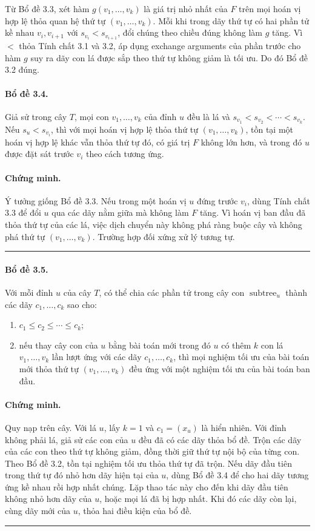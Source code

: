 \documentclass[11pt]{article}
\begin{document}
Từ Bổ đề 3.3, xét hàm $g(v_1,\ldots,v_k)$ là giá trị nhỏ nhất của $F$ trên mọi
hoán vị hợp lệ thỏa quan hệ thứ tự $(v_1,\ldots,v_k)$. Mỗi khi trong dãy thứ tự
có hai phần tử kề nhau $v_i,v_{i+1}$ với $s_{v_i}<s_{v_{i+1}}$, đổi chúng theo
chiều đúng không làm $g$ tăng. Vì $<$ thỏa Tính chất 3.1 và 3.2, áp dụng
exchange arguments của phần trước cho hàm $g$ suy ra dãy con lá được sắp theo
thứ tự không giảm là tối ưu. Do đó Bổ đề 3.2 đúng.

\paragraph{Bổ đề 3.4.}
Giả sử trong cây $T$, mọi con $v_1,\ldots,v_k$ của đỉnh $u$ đều là lá và
$s_{v_1}<s_{v_2}<\cdots<s_{v_k}$. Nếu $s_u<s_{v_i}$, thì với mọi hoán vị hợp lệ
thỏa thứ tự $(v_1,\ldots,v_k)$, tồn tại một hoán vị hợp lệ khác vẫn thỏa thứ tự
đó, có giá trị $F$ không lớn hơn, và trong đó $u$ được đặt sát trước $v_i$ theo
cách tương ứng.

\paragraph{Chứng minh.}
Ý tưởng giống Bổ đề 3.3. Nếu trong một hoán vị $u$ đứng trước $v_i$, dùng Tính
chất 3.3 để đổi $u$ qua các dãy nằm giữa mà không làm $F$ tăng. Vì hoán vị ban
đầu đã thỏa thứ tự của các lá, việc dịch chuyển này không phá ràng buộc cây và
không phá thứ tự $(v_1,\ldots,v_k)$. Trường hợp đối xứng xử lý tương tự.
\hfill\rule{0.55em}{0.55em}

\paragraph{Bổ đề 3.5.}
Với mỗi đỉnh $u$ của cây $T$, có thể chia các phần tử trong cây con
$\operatorname{subtree}_u$ thành các dãy $c_1,\ldots,c_k$ sao cho:
\begin{enumerate}
  \item $c_1\le c_2\le\cdots\le c_k$;
  \item nếu thay cây con của $u$ bằng bài toán mới trong đó $u$ có thêm $k$ con
  lá $v_1,\ldots,v_k$ lần lượt ứng với các dãy $c_1,\ldots,c_k$, thì mọi nghiệm
  tối ưu của bài toán mới thỏa thứ tự $(v_1,\ldots,v_k)$ đều ứng với một nghiệm
  tối ưu của bài toán ban đầu.
\end{enumerate}

\paragraph{Chứng minh.}
Quy nạp trên cây. Với lá $u$, lấy $k=1$ và $c_1=(x_u)$ là hiển nhiên. Với đỉnh
không phải lá, giả sử các con của $u$ đều đã có các dãy thỏa bổ đề. Trộn các
dãy của các con theo thứ tự không giảm, đồng thời giữ thứ tự nội bộ của từng
con. Theo Bổ đề 3.2, tồn tại nghiệm tối ưu thỏa thứ tự đã trộn. Nếu dãy đầu
tiên trong thứ tự đó nhỏ hơn dãy hiện tại của $u$, dùng Bổ đề 3.4 để cho hai
dãy tương ứng kề nhau rồi hợp nhất chúng. Lặp thao tác này cho đến khi dãy đầu
tiên không nhỏ hơn dãy của $u$, hoặc mọi lá đã bị hợp nhất. Khi đó các dãy còn
lại, cùng dãy mới của $u$, thỏa hai điều kiện của bổ đề. \hfill\rule{0.55em}{0.55em}
\end{document}
